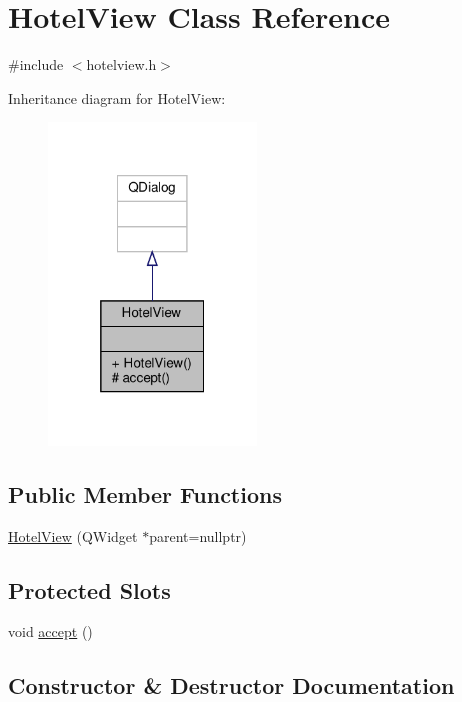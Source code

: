 \hypertarget{class_hotel_view}{}\section{Hotel\+View Class Reference}
\label{class_hotel_view}


{\ttfamily \#include $<$hotelview.\+h$>$}



Inheritance diagram for Hotel\+View\+:\nopagebreak
\begin{figure}[H]
\begin{center}
\leavevmode
\includegraphics[width=157pt]{class_hotel_view__inherit__graph}
\end{center}
\end{figure}
\subsection*{Public Member Functions}
\begin{DoxyCompactItemize}
\item 
\hyperlink{class_hotel_view_adba641d84e83365cd5fc499666640dba}{Hotel\+View} (Q\+Widget $\ast$parent=nullptr)
\end{DoxyCompactItemize}
\subsection*{Protected Slots}
\begin{DoxyCompactItemize}
\item 
void \hyperlink{class_hotel_view_a88805d7379290f2540206d384ef962a1}{accept} ()
\end{DoxyCompactItemize}


\subsection{Constructor \& Destructor Documentation}
\mbox{\label{class_hotel_view_adba641d84e83365cd5fc499666640dba}} 
